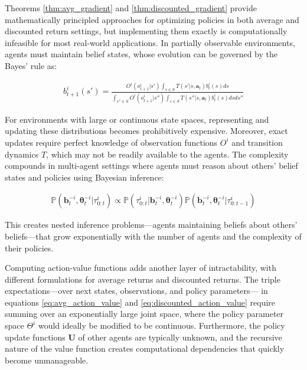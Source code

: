 Theorems \ref{thm:avg_gradient} and \ref{thm:discounted_gradient} provide mathematically principled approaches for optimizing policies in both average and discounted return settings, but implementing them exactly is computationally infeasible for most real-world applications. In partially observable environments, agents must maintain belief states, whose evolution can be governed by the Bayes' rule as:

\begin{align}
    b^i_{t+1}(s') = \frac{O^i(o^i_{t+1}|s') \int_{s \in S} T(s'|s, \boldsymbol{a}_t) b^i_t(s) ds}{\int_{s'' \in S} O^i(o^i_{t+1}|s'') \int_{s \in S} T(s''|s, \boldsymbol{a}_t) b^i_t(s) ds ds''}
\end{align}

For environments with large or continuous state spaces, representing and updating these distributions becomes prohibitively expensive. Moreover, exact updates require perfect knowledge of observation functions $O^i$ and transition dynamics $T$, which may not be readily available to the agents. The complexity compounds in multi-agent settings where agents must reason about others' belief states and policies using Bayesian inference:

\begin{align}
    \mathbb{P}(\boldsymbol{b}^{-i}_t, \boldsymbol{\theta}^{-i}_t | \tau^i_{0:t}) \propto \mathbb{P}(\tau^i_{0:t} | \boldsymbol{b}^{-i}_t, \boldsymbol{\theta}^{-i}_t) \mathbb{P}(\boldsymbol{b}^{-i}_t, \boldsymbol{\theta}^{-i}_t | \tau^i_{0:t-1})
\end{align}

This creates nested inference problems—agents maintaining beliefs about others' beliefs—that grow exponentially with the number of agents and the complexity of their policies. 

Computing action-value functions adds another layer of intractability, with different formulations for average returns and discounted returns. The triple expectations—over next states, observations, and policy parameters— in equations \eqref{eq:avg_action_value} and \eqref{eq:discounted_action_value} require summing over an exponentially large joint space, where the policy parameter space $\Theta^i$ would ideally be modified to be continuous. Furthermore, the policy update functions $\boldsymbol{U}$ of other agents are typically unknown, and the recursive nature of the value function creates computational dependencies that quickly become unmanageable. 

